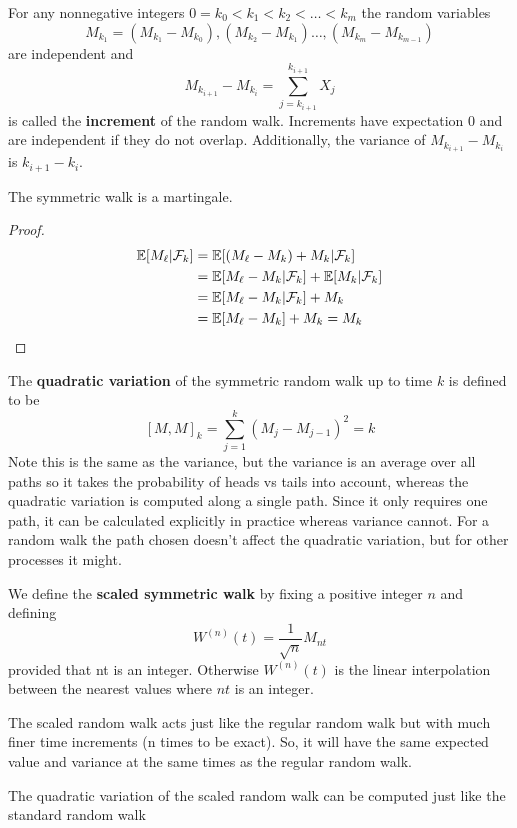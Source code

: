 \documentclass[11pt]{article}
\theoremstyle{definition}
\theoremstyle{definition}
\theoremstyle{definition}
\theoremstyle{remark}
\begin{document}
For any nonnegative integers $0 = k_0 < k_1 < k_2 < \dots < k_m$ the random variables 
\[
    M_{k_1} = (M_{k_1} - M_{k_0}), (M_{k_2} - M_{k_1}) \dots, (M_{k_m} - M_{k_{m - 1}})
\]  
are independent and
\[
    M_{k_{i + 1}} - M_{k_i} = \sum_{j = k_{i + 1}}^{k_{i + 1}} X_j
\] 
is called the \textbf{increment} of the random walk. Increments have expectation $0$ and are independent if they do not overlap.
Additionally, the variance of $M_{k_{i + 1}} - M_{k_i}$ is $k_{i + 1} - k_i$.  

The symmetric walk is a martingale.
\begin{proof}
    \begin{align*}
        \mathbb{E}[M_{\ell} | \mathcal{F}_k] &= \mathbb{E}[(M_{\ell} - M_{k}) + M_k | \mathcal{F}_k] \\
        &= \mathbb{E}[ M_{\ell} - M_{k} | \mathcal{F}_k] + \mathbb{E}[M_k | \mathcal{F}_k] \\ 
        &= \mathbb{E}[ M_{\ell} - M_{k} | \mathcal{F}_k] + M_k \\
        &= \mathbb{E}[ M_{\ell} - M_{k} ] + M_k = M_k \qedhere
    \end{align*}
\end{proof}

The \textbf{quadratic variation} of the symmetric random walk up to time $k$ is defined to be
\[
    [M, M]_k = \sum_{j = 1}^k (M_j - M_{j - 1})^2 = k
\] 
Note this is the same as the variance, but the variance is an average over all paths so it takes the probability of heads vs tails
into account, whereas the quadratic variation is computed along a single path. Since it only requires one path, it can
be calculated explicitly in practice whereas variance cannot. For a random walk the path chosen doesn't affect the 
quadratic variation, but for other processes it might.

We define the \textbf{scaled symmetric walk} by fixing a positive integer $n$ and defining
\[
    W^{(n)}(t) = \frac{1}{\sqrt{n}}M_{nt}
\]  
provided that nt is an integer. Otherwise $W^{(n)}(t)$ is the linear interpolation between the nearest values where $nt$ is
an integer.

The scaled random walk acts just like the regular random walk but with much finer time increments (n times to be exact).
So, it will have the same expected value and variance at the same times as the regular random walk.

The quadratic variation of the scaled random walk can be computed just like the standard random walk
\end{document}
